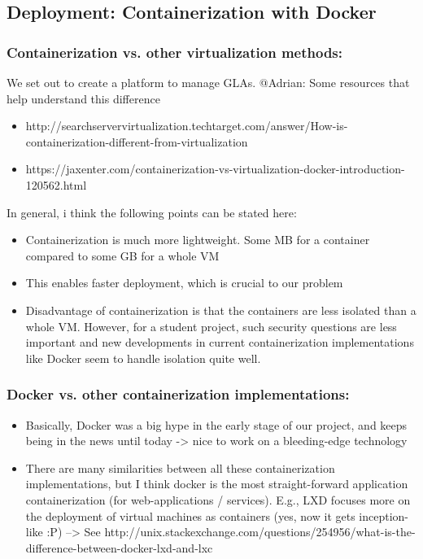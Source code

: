 \documentclass{seal_thesis}
\begin{document}
\subsection{Deployment: Containerization with Docker}
\subsubsection{Containerization vs. other virtualization methods:}
We set out to create a platform to manage GLAs.
@Adrian: Some resources that help understand this difference
\begin{itemize}
	\item http://searchservervirtualization.techtarget.com/answer/How-is-containerization-different-from-virtualization
	\item https://jaxenter.com/containerization-vs-virtualization-docker-introduction-120562.html
\end{itemize}

In general, i think the following points can be stated here:
\begin{itemize}
	\item Containerization is much more lightweight. Some MB for a container compared to some GB for a whole VM
	\item This enables faster deployment, which is crucial to our problem
	\item Disadvantage of containerization is that the containers are less isolated than a whole VM. However, for a student project, such security questions are less important and new developments in current containerization implementations like Docker seem to handle isolation quite well.
\end{itemize}


\subsubsection{Docker vs. other containerization implementations:}
\begin{itemize}
	\item Basically, Docker was a big hype in the early stage of our project, and keeps being in the news until today -> nice to work on a bleeding-edge technology
	\item There are many similarities between all these containerization implementations, but I think docker is the most straight-forward application containerization (for web-applications / services). E.g., LXD focuses more on the deployment of virtual machines as containers (yes, now it gets inception-like :P)
	--> See http://unix.stackexchange.com/questions/254956/what-is-the-difference-between-docker-lxd-and-lxc
\end{itemize}
\end{document}
